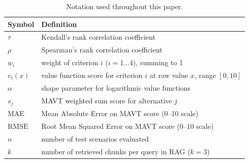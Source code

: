 \documentclass[final,3p,times]{elsarticle}
\begin{document}
\begin{table}[t]
\small
\centering
\renewcommand{\arraystretch}{1.15}
\begin{tabular}{ll}
\toprule
Symbol & Definition \\
\midrule
$\tau$ & Kendall's rank correlation coefficient \\
$\rho$ & Spearman's rank correlation coefficient \\
$w_i$ & weight of criterion $i$ ($i=1\ldots4$), summing to 1 \\
$v_i(x)$ & value function score for criterion $i$ at raw value $x$, range $[0,10]$ \\
$\alpha$ & shape parameter for logarithmic value functions \\
$s_j$ & MAVT weighted sum score for alternative $j$ \\
$\text{MAE}$ & Mean Absolute Error on MAVT score (0--10 scale) \\
$\text{RMSE}$ & Root Mean Squared Error on MAVT score (0--10 scale) \\
$n$ & number of test scenarios evaluated \\
$k$ & number of retrieved chunks per query in RAG ($k=3$) \\
\bottomrule
\end{tabular}
\renewcommand{\arraystretch}{1.0}
\caption{Notation used throughout this paper.}
\label{tab:notation}
\end{table}
\end{document}
